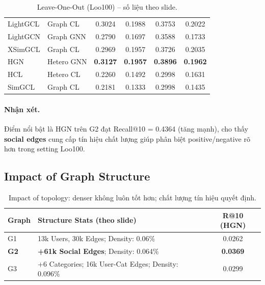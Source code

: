 \documentclass[11pt]{article}
\begin{document}
\begin{table}[t]
\begin{tabular}{l l c c c c}
LightGCL  & Graph CL & 0.3024 & 0.1988 & 0.3753 & 0.2022 \\
LightGCN  & Graph GNN& 0.2790 & 0.1697 & 0.3588 & 0.1733 \\
XSimGCL   & Graph CL & 0.2969 & 0.1957 & 0.3726 & 0.2035 \\
HGN       & Hetero GNN & \textbf{0.3127} & \textbf{0.1957} & \textbf{0.3896} & \textbf{0.1962} \\
HCL       & Hetero CL  & 0.2260 & 0.1492 & 0.2998 & 0.1631 \\
SimGCL    & Graph CL & 0.2181 & 0.1333 & 0.2998 & 0.1435 \\
\bottomrule
\end{tabular}
\caption{Leave-One-Out (Loo100) -- số liệu theo slide.}
\label{tab:loo100}
\end{table}

\paragraph{Nhận xét.}
Điểm nổi bật là HGN trên G2 đạt Recall@10 = 0.4364 (tăng mạnh), cho thấy \textbf{social edges} cung cấp tín hiệu chất lượng giúp phân biệt positive/negative rõ hơn trong setting Loo100.

\subsection{Impact of Graph Structure}
\begin{table}[t]
\centering
\small
\begin{tabular}{l p{5.8cm} c}
\toprule
\textbf{Graph} & \textbf{Structure Stats (theo slide)} & \textbf{R@10 (HGN)}\\
\midrule
G1 & 13k Users, 30k Edges; Density: 0.06\% & 0.0262\\
\textbf{G2} & \textbf{+61k Social Edges}; Density: 0.064\% & \textbf{0.0369}\\
G3 & +6 Categories; 16k User-Cat Edges; Density: 0.096\% & 0.0299\\
\bottomrule
\end{tabular}
\caption{Impact of topology: denser không luôn tốt hơn; chất lượng tín hiệu quyết định.}
\label{tab:impact-graph}
\end{table}
\end{document}
